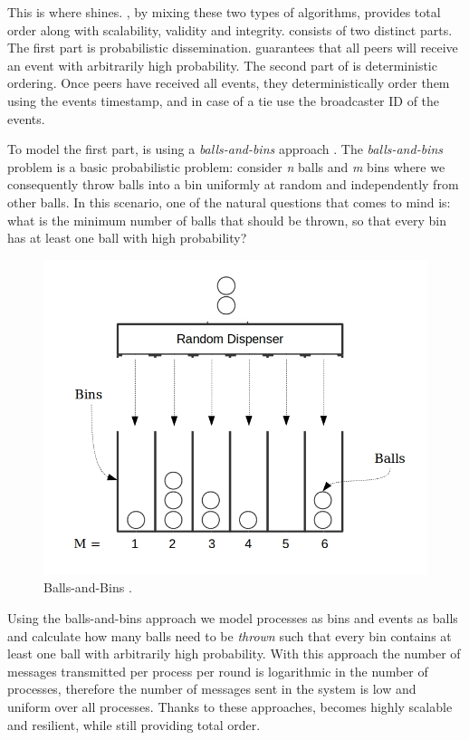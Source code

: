 \par
This is where \epto shines. \epto, by mixing these two types of algorithms, provides total order along with scalability, validity and integrity. 
\epto consists of two distinct parts. The first part is probabilistic dissemination. \epto guarantees that all peers will receive an event with arbitrarily high probability. The second part of \epto is deterministic ordering. Once peers have received all events, they deterministically order them using the events timestamp, and in case of a tie use the broadcaster ID of the events.
\par
To model the first part, \epto is using a \textit{balls-and-bins} approach \autocite{Koldehofe02simplegossiping}. The \textit{balls-and-bins} problem is a basic probabilistic problem: consider \textit{n} balls and \textit{m} bins where we consequently throw balls into a bin uniformly at random and independently from other balls. In this scenario, one of the natural questions that comes to mind is: what is the minimum number of balls that should be thrown, so that every bin has at least one ball with high probability?
\begin{figure}
	\includegraphics[width=\linewidth]{figures/BnB.jpeg}
	\caption{Balls-and-Bins \autocite{bnb}.}
	\label{fig:balls-and-bins}
\end{figure}
\par
Using the balls-and-bins approach we model processes as bins and events as balls and calculate how many balls need to be \textit{thrown} such that every bin contains at least one ball with arbitrarily high probability. With this approach the number of messages transmitted per process per round is logarithmic in the number of processes, therefore the number of messages sent in the system is low and uniform over all processes. Thanks to these approaches, \epto becomes highly scalable and resilient, while still providing total order.
